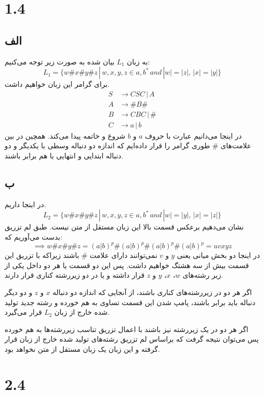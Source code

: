 \section*{1.4}

\subsection*{الف}
به زبان $L_1$ بیان شده به صورت زیر توجه می‌کنیم:
\[
L_1 = \{w\#x\#y\#z \,|\, w,x,y,z \in {a,b}^{*} \,and\, |w| = |z|,\, |x| = |y|\}    
\]
برای گرامر این زبان خواهیم داشت.
\begin{align*}
	S &\to C S C \,|\, A \\
	A &\to \# B \# \\
	B &\to C B C \,|\, \# \\
	C &\to a \,|\, b
\end{align*}
در اینجا می‌دانیم عبارت با حروف
$a$
و
$b$
شروع و خاتمه پیدا می‌کند. همچین در بین علامت‌های
$\#$
طوری گرامر را قرار داده‌ایم که اندازه دو دنباله وسطی با یکدیگر و دو دنباله ابتدایی و انتهایی با هم برابر باشند.

\subsection*{ب}
در اینجا داریم.
\[
L_2 = \{w\#x\#y\#z \,|\, w,x,y,z \in {a,b}^{*} \,and\, |w| = |y|,\, |x| = |z|\}  
\]
نشان می‌دهیم برعکس قسمت بالا این زبان مستقل از متن نیست. طبق لم تزریق بدست می‌آوریم که:
\[
\implies w\#x\#y\#z = (a|b)^p \# (a|b)^p \# (a|b)^p \# (a|b)^p = uvxyz 
\]
در اینجا دو بخش میانی یعنی
$y$
و
$v$
نمی‌توانند دارای علامت‌
$\#$
باشند زیراکه با تزریق این قسمت بیش از سه هشتگ خواهیم داشت. پس این دو قسمت یا هر دو داخل یکی از زیر رشته‌های
$w$، $x$، $y$ و $z$
قرار داشته و یا در دو زیررشته کناری قرار دارند.

اگر هر دو در زیررشته‌های کناری باشند، از آنجایی که اندازه دو دنباله
$x$
و
$z$
و دو دیگر دنباله باید برابر باشند، پامپ شدن این قسمت تساوی به هم خورده و رشته جدید تولید شده خارج از زبان
$L_2$
قرار می‌گیرد.

اگر هر دو در یک زیررشته نیز باشند با اعمال تزریق تناسب زیررشته‌ها به هم خورده پس می‌توان نتیجه گرفت که براساس لم تزریق رشته‌های تولید شده خارج از زبان قرار گرفته و این زبان یک زبان مستقل از متن نخواهد بود.

\section*{2.4}

